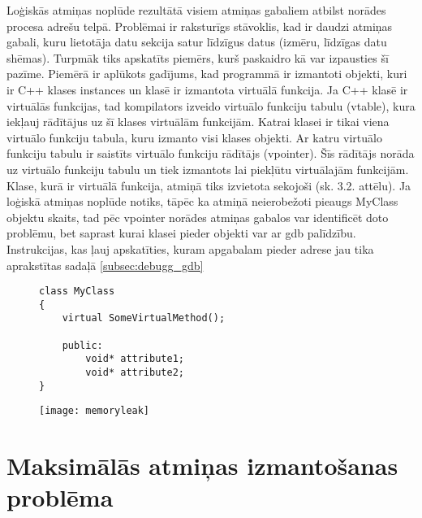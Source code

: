 Loģiskās atmiņas noplūde rezultātā visiem atmiņas gabaliem atbilst norādes procesa adrešu telpā.
Problēmai ir raksturīgs stāvoklis, kad ir daudzi atmiņas gabali, kuru lietotāja datu sekcija satur līdzīgus datus (izmēru, līdzīgas datu shēmas).
Turpmāk tiks apskatīts piemērs, kurš paskaidro kā var izpausties šī pazīme.
Piemērā ir aplūkots gadījums, kad programmā ir izmantoti objekti, kuri ir  C++ klases instances un klasē ir izmantota virtuālā funkcija.
Ja C++ klasē ir virtuālās funkcijas, tad kompilators izveido virtuālo funkciju tabulu (vtable), kura iekļauj rādītājus uz šī klases virtuālām funkcijām.
 Katrai klasei ir tikai viena virtuālo funkciju tabula, kuru izmanto visi klases objekti.
 Ar katru virtuālo funkciju tabulu ir saistīts virtuālo funkciju rādītājs (vpointer).
 Šīs rādītājs norāda uz virtuālo funkciju tabulu un tiek izmantots lai piekļūtu virtuālajām funkcijām.
Klase, kurā ir virtuālā funkcija, atmiņā tiks izvietota sekojoši (sk. 3.2. attēlu).
Ja loģiskā atmiņas noplūde notiks, tāpēc ka atmiņā neierobežoti pieaugs MyClass objektu skaits, tad pēc vpointer norādes atmiņas gabalos var identificēt doto problēmu, bet saprast kurai klasei pieder objekti var ar gdb palīdzību.
Instrukcijas, kas ļauj apskatīties, kuram apgabalam pieder adrese jau tika aprakstītas sadaļā \ref{subsec:debugg_gdb}
\begin{figure}[h]
\begin{lstlisting}
class MyClass
{
    virtual SomeVirtualMethod();

    public:
        void* attribute1;
        void* attribute2;
}
\end{lstlisting}
\end{figure}
\begin{figure}[h]
\begin{center}
\texttt{[image: memoryleak]}
\end{center}
\caption{\textbf{\fontsize{11}{12}\selectfont {C++ klases ar virtuālo funkciju izvietojums atmiņā }}}
\label{fig:memoryleak}
\end{figure}



\section{Maksimālās atmiņas izmantošanas problēma}



